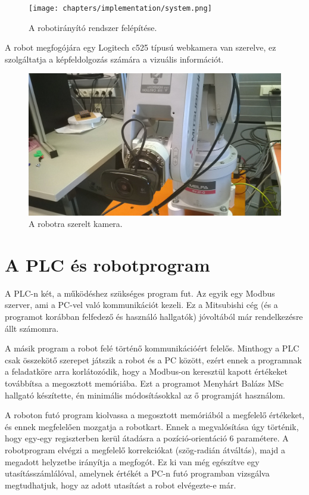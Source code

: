 \begin{figure}[H]
\centering
\texttt{[image: chapters/implementation/system.png]}
\caption{A robotirányító rendszer felépítése.}
\end{figure}
	
	A robot megfogójára egy Logitech c525 típusú webkamera van szerelve, ez szolgáltatja a képfeldolgozás számára a vizuális információt.
	
	
\begin{figure}[H]
\centering
\includegraphics[width=\linewidth]{chapters/implementation/robocam.jpg}
\caption{A robotra szerelt kamera.}
\end{figure}
	
	\section{A PLC és robotprogram}
	
	A PLC-n két, a működéshez szükséges program fut. Az egyik egy Modbus szerver, ami a PC-vel való kommunikációt kezeli. Ez a Mitsubishi cég (és a programot korábban felfedező és használó hallgatók) jóvoltából már rendelkezésre állt számomra. 
	
	A másik program a robot felé történő kommunikációért felelős. Minthogy a PLC csak összekötő szerepet játszik a robot és a PC között, ezért ennek a programnak a feladatköre arra korlátozódik, hogy a Modbus-on keresztül kapott értékeket továbbítsa a megosztott memóriába. Ezt a programot Menyhárt Balázs MSc hallgató készítette, én minimális módosításokkal az ő programját használom.
	
	A roboton futó program kiolvassa a megosztott memóriából a megfelelő értékeket, és ennek megfelelően mozgatja a robotkart. Ennek a megvalósítása úgy történik, hogy egy-egy regiszterben kerül átadásra a pozíció-orientáció 6 paramétere. A robotprogram elvégzi a megfelelő korrekciókat (szög-radián átváltás), majd a megadott helyzetbe irányítja a megfogót. Ez ki van még egészítve egy utasításszámlálóval, amelynek értékét a PC-n futó programban vizsgálva megtudhatjuk, hogy az adott utasítást a robot elvégezte-e már.

